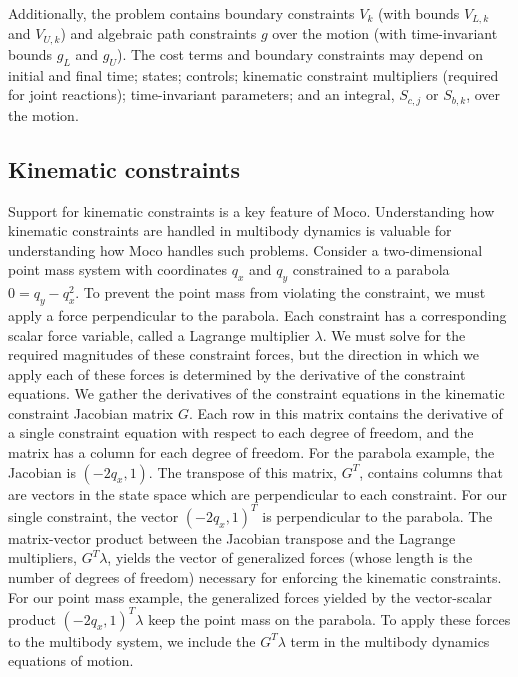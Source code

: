 \documentclass[10pt,letterpaper]{article}
\begin{document}
Additionally, the problem contains boundary constraints $V_k$ (with bounds $V_{L,k}$ and $V_{U,k}$) and algebraic path constraints $g$ over the motion (with time-invariant bounds $g_L$ and $g_U$). The cost terms and boundary constraints may depend on initial and final time; states; controls; kinematic constraint multipliers (required for joint reactions); time-invariant parameters; and an integral, $S_{c,j}$ or $S_{b,k}$, over the motion.

\subsection*{Kinematic constraints}

Support for kinematic constraints is a key feature of Moco. Understanding how kinematic constraints are handled in multibody dynamics is valuable for understanding how Moco handles such problems. Consider a two-dimensional point mass system with coordinates $q_x$ and $q_y$ constrained to a parabola $0 = q_y - q_x^2$. To prevent the point mass from violating the constraint, we must apply a force perpendicular to the parabola. Each constraint has a corresponding scalar force variable, called a Lagrange multiplier $\lambda$. We must solve for the required magnitudes of these constraint forces, but the direction in which we apply each of these forces is determined by the derivative of the constraint equations. We gather the derivatives of the constraint equations in the kinematic constraint Jacobian matrix $G$. Each row in this matrix contains the derivative of a single constraint equation with respect to each degree of freedom, and the matrix has a column for each degree of freedom. For the parabola example, the Jacobian is $( -2q_x, 1)$. The transpose of this matrix, $G^T$, contains columns that are vectors in the state space which are perpendicular to each constraint. For our single constraint, the vector $(-2q_x, 1)^T$ is perpendicular to the parabola. The matrix-vector product between the Jacobian transpose and the Lagrange multipliers, $G^T \lambda$, yields the vector of generalized forces (whose length is the number of degrees of freedom) necessary for enforcing the kinematic constraints. For our point mass example, the generalized forces yielded by the vector-scalar product  $(-2q_x, 1)^T \lambda$ keep the point mass on the parabola. To apply these forces to the multibody system, we include the $G^T \lambda$ term in the multibody dynamics equations of motion.
\end{document}

